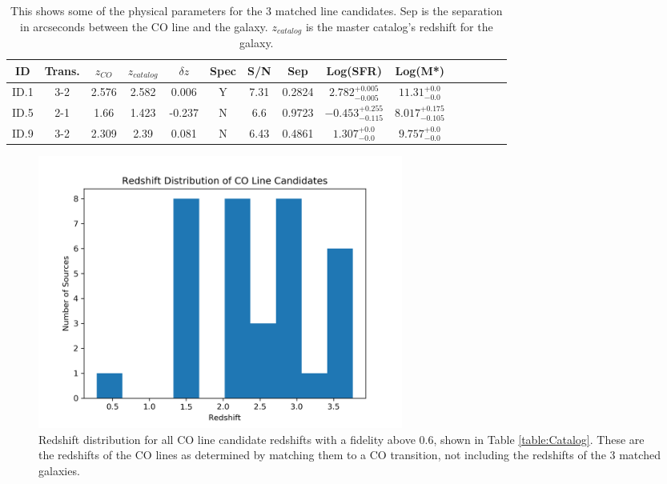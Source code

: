 \begin{table}
\caption{This shows some of the physical parameters for the 3 matched line candidates. Sep is the separation in arcseconds between the CO line and the galaxy. $z_{catalog}$ is the master catalog's redshift for the galaxy.}
\begin{tabular}{ccccccccccccccc}
ID & Trans. & $z_{CO}$ & $z_{catalog}$ & $\delta z$ & Spec & S/N & Sep & Log(SFR) & Log(M*) \\
\hline
ID.1 & 3-2 & 2.576 & 2.582 & 0.006 & Y & 7.31 & 0.2824 & $2.782_{-0.005}^{+0.005}$ & $11.31_{-0.0}^{+0.0}$  \\
ID.5 & 2-1 & 1.66 & 1.423 & -0.237 & N & 6.6 & 0.9723 & $-0.453_{-0.115}^{+0.255}$ & $8.017_{-0.105}^{+0.175}$ \\
ID.9 & 3-2 & 2.309 & 2.39 & 0.081 & N & 6.43 & 0.4861 & $1.307_{-0.0}^{+0.0}$ & $9.757_{-0.0}^{+0.0}$ \\
\end{tabular}\label{table:matched_gal}
\end{table}

\begin{figure}[!htbp]
\centering \includegraphics[width=120mm]{Survey/redshift_catalog.png}
\caption{Redshift distribution for all CO line candidate redshifts with a fidelity above 0.6, shown in Table \ref{table:Catalog}. These are the redshifts of the CO lines as determined by matching them to a CO transition, not including the redshifts of the 3 matched galaxies.}
\label{fig:cat_red}
\end{figure}

